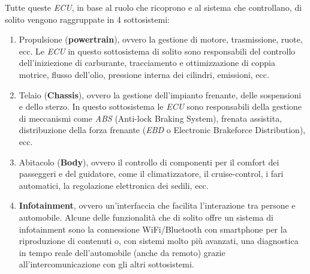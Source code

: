 Tutte queste \emph{ECU}, in base al ruolo che ricoprono e al sistema che controllano, di solito vengono raggruppate in 4 sottosistemi:
\begin{enumerate}
    \item Propulsione (\textbf{powertrain}), ovvero la gestione di motore, trasmissione, ruote, ecc. Le \emph{ECU} in questo sottosistema di solito sono responsabili del controllo dell'iniziezione di carburante, tracciamento e ottimizzazione di coppia motrice, flusso dell'olio, pressione interna dei cilindri, emissioni, ecc.
    \item Telaio (\textbf{Chassis}), ovvero la gestione dell'impianto frenante, delle sospensioni e dello sterzo. In questo sottosistema le \emph{ECU} sono responsabili della gestione di meccanismi come \emph{ABS} (Anti-lock Braking System), frenata assistita, distribuzione della forza frenante (\emph{EBD} o Electronic Brakeforce Distribution), ecc.
    \item Abitacolo (\textbf{Body}), ovvero il controllo di componenti per il comfort dei passeggeri e del guidatore, come il climatizzatore, il cruise-control, i fari automatici, la regolazione elettronica dei sedili, ecc.
    \item \textbf{Infotainment}, ovvero un'interfaccia che facilita l'interazione tra persone e automobile. Alcune delle funzionalità che di solito offre un sistema di infotainment sono la connessione WiFi/Bluetooth con smartphone per la riproduzione di contenuti o, con sistemi molto più avanzati, una diagnostica in tempo reale dell'automobile (anche da remoto) grazie all'intercomunicazione con gli altri sottosistemi. \cite{huang_2019_invehicle}
\end{enumerate}


